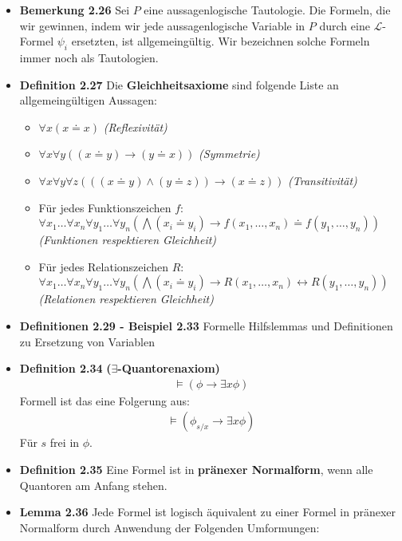 \documentclass{scrartcl}
\renewcommand{\models}[0]{\vDash}
\begin{document}
\begin{itemize}
    \item \textbf{Bemerkung 2.26} Sei $P$ eine aussagenlogische Tautologie. Die Formeln, die wir gewinnen, indem wir jede aussagenlogische Variable in $P$ durch eine $\mathcal{L}$-Formel $\psi_i$ ersetzten, ist allgemeingültig. Wir bezeichnen solche Formeln immer noch als Tautologien.
    \item \textbf{Definition 2.27} Die \textbf{Gleichheitsaxiome} sind folgende Liste an allgemeingültigen Aussagen:
    \begin{itemize}
        \item $\forall x (x \doteq x)$ \textit{(Reflexivität)}
        \item $\forall x \forall y ((x \doteq y) \to (y \doteq x))$ \textit{(Symmetrie)}
        \item $\forall x \forall y \forall z (((x \doteq y) \wedge (y \doteq z)) \to (x \doteq z))$ \textit{(Transitivität)}
        \item Für jedes Funktionszeichen $f$:\\ $\forall x_1 \hdots \forall x_n \forall y_1 \hdots \forall y_n (\bigwedge (x_i \doteq y_i) \to f(x_1, \hdots, x_n) \doteq f(y_1, \hdots, y_n))$\\
        \textit{(Funktionen respektieren Gleichheit)}
        \item Für jedes Relationszeichen $R$:\\ $\forall x_1 \hdots \forall x_n \forall y_1 \hdots \forall y_n (\bigwedge (x_i \doteq y_i) \to R(x_1, \hdots, x_n) \leftrightarrow R(y_1, \hdots, y_n))$\\
        \textit{(Relationen respektieren Gleichheit)}
    \end{itemize}
    \item \textbf{Definitionen 2.29 - Beispiel 2.33} Formelle Hilfslemmas und Definitionen zu Ersetzung von Variablen
    \item \textbf{Definition 2.34} \textbf{($\exists$-Quantorenaxiom)} 
    \begin{align*}
        \models (\phi \rightarrow \exists x \phi)
    \end{align*}
    Formell ist das eine Folgerung aus:
    \begin{align*}
        \models (\phi_{s/x} \rightarrow \exists x \phi)
    \end{align*}
    Für $s$ frei in $\phi$.
    \item \textbf{Definition 2.35} Eine Formel ist in \textbf{pränexer Normalform}, wenn alle Quantoren am Anfang stehen.
    \item \textbf{Lemma 2.36} Jede Formel ist logisch äquivalent zu einer Formel in pränexer Normalform durch Anwendung der Folgenden Umformungen:

\end{itemize}
\end{document}
